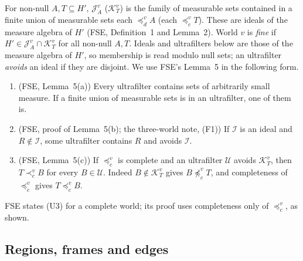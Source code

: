\documentclass[11pt]{article}
\theoremstyle{definition}\newtheorem{definition}[theorem]{Definition}
\theoremstyle{remark}\newtheorem{remark}[theorem]{Remark}
\newcommand{\Jid}{\mathcal J}
\newcommand{\Kid}{\mathcal K}
\newcommand{\Iid}{\mathcal I}
\newcommand{\Uf}{\mathcal U}
\begin{document}
For non-null $A,T\subseteq H'$, $\Jid^v_A$ ($\Kid^v_T$) is the family of
measurable sets contained in a finite union of measurable sets each
$\preceq^v_dA$ (each $\preceq^v_cT$). These are ideals of the measure
algebra of $H'$ (FSE, Definition~1 and Lemma~2). World $v$ is \emph{fine}
if $H'\in\Jid^v_A\cap\Kid^v_T$ for all non-null $A,T$. Ideals and
ultrafilters below are those of the measure algebra of $H'$, so membership
is read modulo null sets; an ultrafilter \emph{avoids} an ideal if they are
disjoint. We use FSE's Lemma~5 in the following form.
\begin{enumerate}[label=(U\arabic*),leftmargin=*,itemsep=2pt]
\item\label{U:small} (FSE, Lemma~5(a)) Every ultrafilter contains sets of
arbitrarily small measure. If a finite union of measurable sets is in an
ultrafilter, one of them is.
\item\label{U:avoid} (FSE, proof of Lemma~5(b); the three-world note,
(F1)) If $\Iid$ is an ideal and $R\notin\Iid$, some ultrafilter contains $R$
and avoids $\Iid$.
\item\label{U:strict} (FSE, Lemma~5(c)) If $\preceq^v_c$ is complete and an
ultrafilter $\Uf$ avoids $\Kid^v_T$, then $T\prec^v_cB$ for every
$B\in\Uf$. Indeed $B\notin\Kid^v_T$ gives $B\not\preceq^v_cT$, and
completeness of $\preceq^v_c$ gives $T\preceq^v_cB$.
\end{enumerate}
FSE states (U3) for a complete world; its proof uses completeness only of
$\preceq^v_c$, as shown.

\subsection{Regions, frames and edges}\label{sec:frames}
\end{document}
